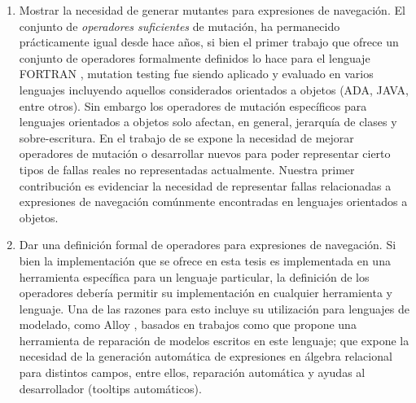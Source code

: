 \begin{enumerate}
	\item Mostrar la necesidad de generar mutantes para expresiones de navegaci\'on. El conjunto de \emph{operadores suficientes} de mutaci\'on, ha permanecido pr\'acticamente igual desde hace a\~nos, si bien el primer trabajo que ofrece un conjunto de operadores formalmente definidos lo hace para el lenguaje FORTRAN \cite{bibliography.mutation.definitions.fortranOffut87, bibliography.mutation.definitions.fortranKing91}, mutation testing fue siendo aplicado y evaluado en varios lenguajes incluyendo aquellos considerados orientados a objetos (ADA, JAVA, entre otros). Sin embargo los operadores de mutaci\'on espec\'ificos para lenguajes orientados a objetos solo afectan, en general, jerarqu\'ia de clases y sobre-escritura. En el trabajo de \cite{bibliography.mutation.evaluation.valid-substitute} se expone la necesidad de mejorar operadores de mutaci\'on o desarrollar nuevos para poder representar cierto tipos de fallas reales no representadas actualmente. Nuestra primer contribuci\'on es evidenciar la necesidad de representar fallas relacionadas a expresiones de navegaci\'on com\'unmente encontradas en lenguajes orientados a objetos.
	
	\item Dar una definici\'on formal de operadores para expresiones de navegaci\'on. Si bien la implementaci\'on que se ofrece en esta tesis es implementada en una herramienta espec\'ifica para un lenguaje particular, la definici\'on de los operadores deber\'ia permitir su implementaci\'on en cualquier herramienta y lenguaje. Una de las razones para esto incluye su utilizaci\'on para lenguajes de modelado, como Alloy \cite{bibliography.books.SoftwareAbstractions-alloy}, basados en trabajos como \cite{bibliography.repair.mutation.AlloyWang18} que propone una herramienta de reparaci\'on de modelos escritos en este lenguaje; \cite{bibliography.algebraicExpressions.RexGenWang18} que expone la necesidad de la generaci\'on autom\'atica de expresiones en \'algebra relacional para distintos campos, entre ellos, reparaci\'on autom\'atica y ayudas al desarrollador (tooltips autom\'aticos).
	

\end{enumerate}
